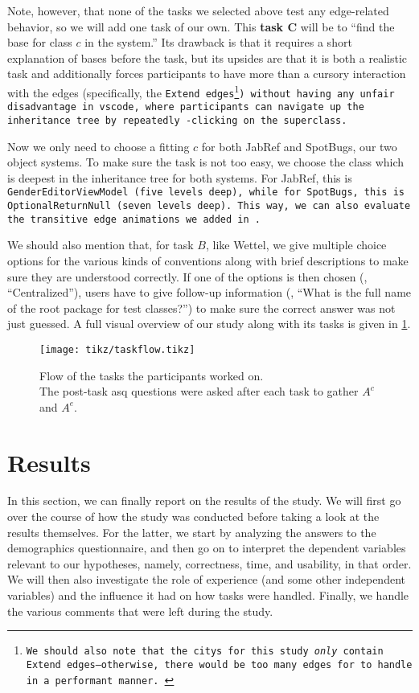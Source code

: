 \documentclass[../thesis]{subfiles}
\begin{document}
Note, however, that none of the tasks we selected above test any edge-related behavior, so we will add one task of our own.
This \textbf{task $\bm{C}$} will be to \enquote{find the \gls{base} for class $c$ in the system.}
Its drawback is that it requires a short explanation of \glspl{base} before the task, but its upsides are that it is both a realistic task and additionally forces participants to have more than a cursory interaction with the edges (specifically, the \tt{Extend} edges\footnote{
	We should also note that the \glspl{city} for this study \emph{only} contain \tt{Extend} edges---otherwise, there would be too many edges for \SEE{} to handle in a performant manner.
}) without having any unfair disadvantage in \gls{vscode}, where participants can navigate up the inheritance tree by repeatedly -clicking on the superclass.

Now we only need to choose a fitting $c$ for both JabRef and SpotBugs, our two object systems.
To make sure the task is not too easy, we choose the class which is deepest in the inheritance tree for both systems.
For JabRef, this is \tt{GenderEditorViewModel} (five levels deep), while for SpotBugs, this is \tt{OptionalReturnNull} (seven levels deep).
This way, we can also evaluate the transitive edge animations we added in .

We should also mention that, for task $B$, like Wettel, we give multiple choice options for the various kinds of conventions along with brief descriptions to make sure they are understood correctly.
If one of the options is then chosen (\eg, \enquote{Centralized}), users have to give follow-up information (\eg, \enquote{What is the full name of the root package for test classes?}) to make sure the correct answer was not just guessed.
A full visual overview of our study along with its tasks is given in \cref{fig:taskflow}.

\begin{figure}
	\captionsetup{format=plain}
	\centering
	\texttt{[image: tikz/taskflow.tikz]}
	\caption{Flow of the tasks the participants worked on.\\
		The post-task \gls{asq} questions were asked after each task to gather $A^c$ and $A^e$.
	}\label{fig:taskflow}
\end{figure}


\section{Results}\label{sec:results}
In this section, we can finally report on the results of the study.
We will first go over the course of how the study was conducted before taking a look at the results themselves.
For the latter, we start by analyzing the answers to the demographics questionnaire, and then go on to interpret the dependent variables relevant to our hypotheses, namely, correctness, time, and usability, in that order.
We will then also investigate the role of experience (and some other independent variables) and the influence it had on how tasks were handled.
Finally, we handle the various comments that were left during the study.
\end{document}
